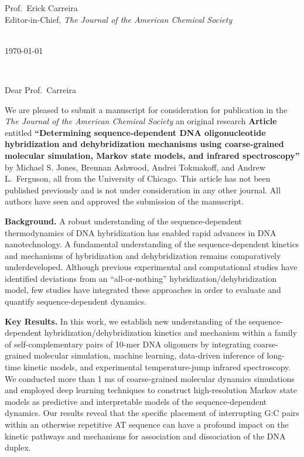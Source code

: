 \documentclass[11pt,a4paper]{letter} %
\makeatletter
\def\opening#1{\thispagestyle{empty}
{\centering\fromaddress \vspace{1.1in} \\ %
%
\hspace*{4.15 in}\today\hspace*{\fill}\par
} %
{\raggedright \toname \\ \toaddress \par} %
\vspace{0.05in} %
\noindent #1 %
}
\makeatother
\begin{document}

\begin{letter}
{
Prof.\ Erick Carreira \\
Editor-in-Chief, \textit{The Journal of the American Chemical Society}
}

\newcommand*{\noteb}[1]{\textcolor{blue}{[[#1]]}}		%

\opening{Dear Prof.\ Carreira}

We are pleased to submit a manuscript for consideration for publication in the \textit{The Journal of the American Chemical Society} an original research \textbf{Article} entitled \textbf{``Determining sequence-dependent DNA oligonucleotide hybridization and dehybridization mechanisms using coarse-grained molecular simulation, Markov state models, and infrared spectroscopy''} by Michael S. Jones, Brennan Ashwood, Andrei Tokmakoff, and Andrew L.\ Ferguson, all from the University of Chicago. This article has not been published previously and is not under consideration in any other journal. All authors have seen and approved the submission of the manuscript.

\textbf{Background.}  A robust understanding of the sequence-dependent thermodynamics of DNA hybridization has enabled rapid advances in DNA nanotechnology. A fundamental understanding of the sequence-dependent kinetics and mechanisms of hybridization and dehybridization remains comparatively underdeveloped. Although previous experimental and computational studies have identified deviations from an ``all-or-nothing'' hybridization/dehybridization model, few studies have integrated these approaches in order to evaluate and quantify sequence-dependent dynamics.

\textbf{Key Results.}  In this work, we establish new understanding of the sequence-dependent hybridization/dehybridization kinetics and mechanism within a family of self-complementary pairs of 10-mer DNA oligomers by integrating coarse-grained molecular simulation, machine learning, data-driven inference of long-time kinetic models, and experimental temperature-jump infrared spectroscopy. We conducted more than 1 ms of coarse-grained molecular dynamics simulations and employed deep learning techniques to construct high-resolution Markov state models as predictive and interpretable models of the sequence-dependent dynamics. Our results reveal that the specific placement of interrupting G:C pairs within an otherwise repetitive AT sequence can have a profound impact on the kinetic pathways and mechanisms for association and dissociation of the DNA duplex.


\end{letter}
\end{document}
